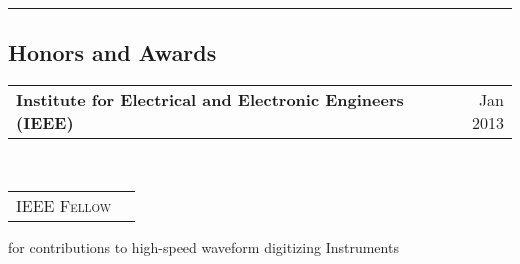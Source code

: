 \documentclass[10pt,letterpaper]{extarticle}
\makeatletter
\newcommand{\headerrow}[2]
{\begin{tabular*}{\linewidth}{l@{\extracolsep{\fill}}r}
	#1 &
	#2 \\
\end{tabular*}}
\makeatother
\begin{document}
\hrule
\vspace{-1em}\subsection*{\Large Honors and Awards}\vspace{-0.5em}
	
	\item[]
	\headerrow
		{\large \textbf{Institute for Electrical and Electronic Engineers (IEEE)}}
		{Jan 2013}
	\\
	\headerrow
		{\large \textsc{IEEE Fellow}}
		{}
	\vspace{-2em}\begin{itemize*}
		\item for contributions to high-speed waveform digitizing Instruments
	\end{itemize*}
\end{document}
